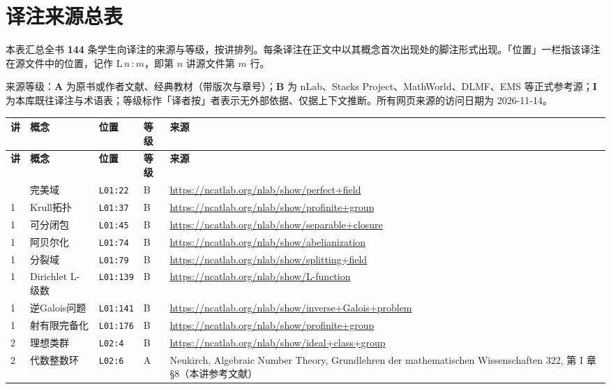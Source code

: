 \renewcommand{\xchaptertitle}{附录\thechapter}
\chapter{译注来源总表}
\begingroup\small{}
本表汇总全书 \textbf{144} 条学生向译注的来源与等级，按讲排列。每条译注在正文中以其概念首次出现处的脚注形式出现。「位置」一栏指该译注在源文件中的位置，记作 L\,$n$\,:\,$m$，即第 $n$ 讲源文件第 $m$ 行。

来源等级：\textbf{A} 为原书或作者文献、经典教材（带版次与章号）；\textbf{B} 为 nLab、Stacks Project、MathWorld、DLMF、EMS 等正式参考源；\textbf{I} 为本库既往译注与术语表；等级标作「译者按」者表示无外部依据、仅据上下文推断。所有网页来源的访问日期为 2026-11-14。

\begin{longtable}{@{}p{1.0cm}p{3.3cm}p{1.5cm}p{1.3cm}p{7.9cm}@{}}
\toprule
\textbf{讲} & \textbf{概念} & \textbf{位置} & \textbf{等级} & \textbf{来源} \\
\midrule
\endfirsthead
\toprule
\textbf{讲} & \textbf{概念} & \textbf{位置} & \textbf{等级} & \textbf{来源} \\
\midrule
\endhead
\bottomrule
\endfoot
1 & 完美域 & \texttt{L01:22} & B & \url{https://ncatlab.org/nlab/show/perfect+field} \\
1 & Krull拓扑 & \texttt{L01:37} & B & \url{https://ncatlab.org/nlab/show/profinite+group} \\
1 & 可分闭包 & \texttt{L01:45} & B & \url{https://ncatlab.org/nlab/show/separable+closure} \\
1 & 阿贝尔化 & \texttt{L01:74} & B & \url{https://ncatlab.org/nlab/show/abelianization} \\
1 & 分裂域 & \texttt{L01:79} & B & \url{https://ncatlab.org/nlab/show/splitting+field} \\
1 & Dirichlet L-级数 & \texttt{L01:139} & B & \url{https://ncatlab.org/nlab/show/L-function} \\
1 & 逆Galois问题 & \texttt{L01:141} & B & \url{https://ncatlab.org/nlab/show/inverse+Galois+problem} \\
1 & 射有限完备化 & \texttt{L01:176} & B & \url{https://ncatlab.org/nlab/show/profinite+group} \\
\midrule
2 & 理想类群 & \texttt{L02:4} & B & \url{https://ncatlab.org/nlab/show/ideal+class+group} \\
2 & 代数整数环 & \texttt{L02:6} & A & Neukirch, Algebraic Number Theory, Grundlehren der mathematischen Wissenschaften 322, 第 I 章 §8（本讲参考文献） \\

\end{longtable}
